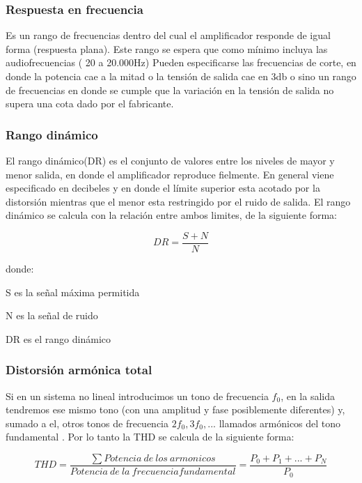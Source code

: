 \subsubsection{Respuesta en frecuencia}

Es un rango de frecuencias dentro del cual el amplificador responde de igual forma (respuesta plana). Este rango se espera que como mínimo incluya las audiofrecuencias ( 20 a 20.000Hz)
Pueden especificarse las frecuencias de corte, en donde la potencia cae a la mitad o la tensión de salida cae en 3db o sino un rango de frecuencias en donde se cumple que la variación en la tensión de salida no supera una cota dado por el fabricante.
\medskip 
\subsubsection{Rango dinámico}

El rango dinámico(DR) es el conjunto de valores entre los niveles de mayor y menor salida, en donde el amplificador reproduce fielmente. En general viene especificado en decibeles y en donde el límite superior esta acotado por la distorsión mientras que el menor esta restringido por el ruido de salida. El rango dinámico se calcula con la relación entre ambos limites, de la siguiente forma:

\begin{equation}\label{rango_dinamico_eq}
DR= \frac{S+N}{N}
\end{equation}

donde:
\begin{description}
\item S es la señal máxima permitida
\item N es la señal de ruido
\item DR es el rango dinámico
\end{description}
\medskip 
\subsubsection{Distorsión armónica total}

Si en un sistema no lineal introducimos un tono de frecuencia $f_0$, en la salida tendremos ese mismo tono (con una amplitud y fase posiblemente diferentes) y, sumado a el, otros tonos de frecuencia $2f_0, 3f_0, ...$ llamados armónicos del tono fundamental . Por lo tanto la THD se calcula de la siguiente forma:

\begin{equation}\label{THD_eq}
THD= \frac{\sum Potencia~de ~los ~armonicos}{Potencia~ de ~la ~frecuencia fundamental}=\frac{P_0+P_1+...+P_N}{P_0}
\end{equation}

